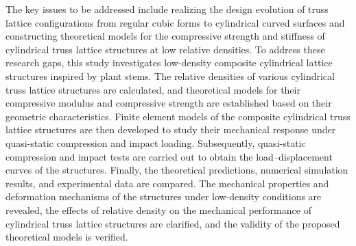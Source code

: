 \documentclass[12pt,a4paper]{article}
\numberwithin{equation}{section}
\begin{document}
	The key issues to be addressed include realizing the design evolution of truss lattice configurations from regular cubic forms to cylindrical curved surfaces and constructing theoretical models for the compressive strength and stiffness of cylindrical truss lattice structures at low relative densities. To address these research gaps, this study investigates low-density composite cylindrical lattice structures inspired by plant stems. The relative densities of various cylindrical truss lattice structures are calculated, and theoretical models for their compressive modulus and compressive strength are established based on their geometric characteristics. Finite element models of the composite cylindrical truss lattice structures are then developed to study their mechanical response under quasi-static compression and impact loading. Subsequently, quasi-static compression and impact tests are carried out to obtain the load--displacement curves of the structures. Finally, the theoretical predictions, numerical simulation results, and experimental data are compared. The mechanical properties and deformation mechanisms of the structures under low-density conditions are revealed, the effects of relative density on the mechanical performance of cylindrical truss lattice structures are clarified, and the validity of the proposed theoretical models is verified.
		
	

	
	
	
	
\end{document}

